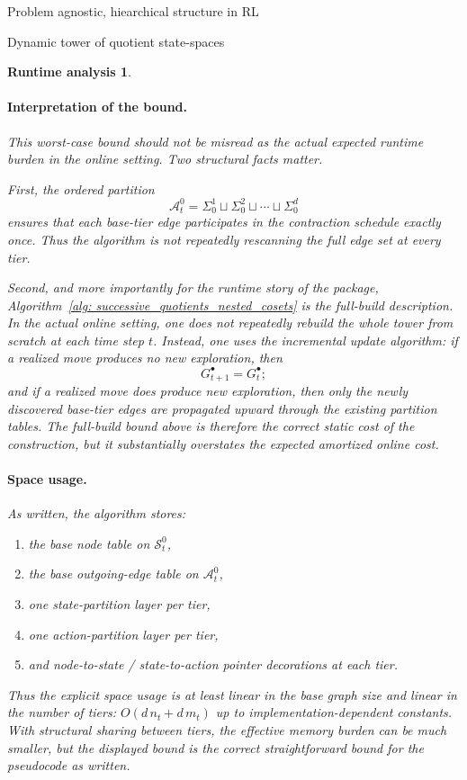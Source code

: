 \documentclass[11pt]{article}
\newtheorem{run_analysis}[subsubsection]{Runtime analysis}
\begin{document}
\begin{section}{Problem agnostic, hiearchical structure in RL}
\begin{subsection}{Dynamic tower of quotient state-spaces}
\begin{run_analysis}
\paragraph{Interpretation of the bound.}
This worst-case bound should not be misread as the actual expected runtime burden in the online setting. Two structural facts matter.

First, the ordered partition
\[
\mathcal{A}_t^0
=
\Sigma_0^1 \sqcup \Sigma_0^2 \sqcup \cdots \sqcup \Sigma_0^d
\]
ensures that each base-tier edge participates in the contraction schedule exactly once. Thus the algorithm is not repeatedly rescanning the full edge set at every tier.

Second, and more importantly for the runtime story of the package, Algorithm~\ref{alg: successive_quotients_nested_cosets} is the \emph{full-build} description. In the actual online setting, one does not repeatedly rebuild the whole tower from scratch at each time step $t$. Instead, one uses the incremental update algorithm: if a realized move produces no new exploration, then
\[
G_{t+1}^\bullet = G_t^\bullet;
\]
and if a realized move does produce new exploration, then only the newly discovered base-tier edges are propagated upward through the existing partition tables. The full-build bound above is therefore the correct static cost of the construction, but it substantially overstates the expected amortized online cost.

\paragraph{Space usage.}
As written, the algorithm stores:
\begin{enumerate}
    \item the base node table on $\mathcal{S}_t^0$,
    \item the base outgoing-edge table on $\mathcal{A}_t^0$,
    \item one state-partition layer per tier,
    \item one action-partition layer per tier,
    \item and node-to-state / state-to-action pointer decorations at each tier.
\end{enumerate}
Thus the explicit space usage is at least linear in the base graph size and linear in the number of tiers:
$
O(d\,n_t + d\,m_t)
$
up to implementation-dependent constants. With structural sharing between tiers, the effective memory burden can be much smaller, but the displayed bound is the correct straightforward bound for the pseudocode as written.


\end{run_analysis}
\end{subsection}
\end{section}
\end{document}
